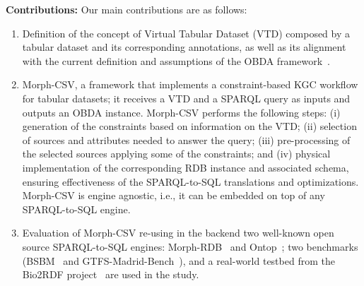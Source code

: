 \noindent\textbf{Contributions:} Our main contributions are as follows:
\begin{enumerate}
\item Definition of the concept of Virtual Tabular Dataset (VTD) composed by a tabular dataset and its corresponding annotations, as well as its alignment with the current definition and assumptions of the OBDA framework~\citep{xiao2018obdasurvey}.
\item Morph-CSV, a framework that implements a constraint-based KGC workflow for tabular datasets; it receives a VTD and a SPARQL query as inputs and outputs an OBDA instance. Morph-CSV performs the following steps: (i) generation of the constraints based on information on the VTD; (ii) selection of sources and attributes needed to answer the query; (iii) pre-processing of the selected sources applying some of the constraints; and (iv) physical implementation of the corresponding RDB instance and associated schema, ensuring effectiveness of the SPARQL-to-SQL translations and optimizations. Morph-CSV is engine agnostic, i.e., it can be embedded on top of any SPARQL-to-SQL engine.
\item Evaluation of Morph-CSV re-using in the backend two well-known open source SPARQL-to-SQL engines: Morph-RDB~\citep{priyatna2014formalisation} and Ontop~\citep{calvanese2017ontop}; two benchmarks (BSBM~\citep{bizer2009berlin} and GTFS-Madrid-Bench~\citep{chaves2020gtfs}), and a real-world testbed from the Bio2RDF project~\citep{belleau2008bio2rdf} are used in the study.
\end{enumerate}




